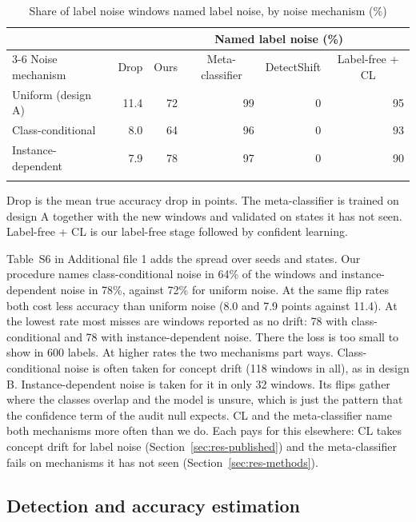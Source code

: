 \documentclass[pdflatex,referee,lineno,sn-basic]{sn-jnl}
\begin{document}
\begin{table}[!htbp]\centering\tablebodyfont
\caption{Share of label noise windows named label noise, by noise mechanism (\%)}\label{tab:noise}%
\begin{tabular}{@{}lrrrrr@{}}
\toprule
 & \multicolumn{1}{c}{} & \multicolumn{4}{c}{Named label noise (\%)} \\
\cmidrule(lr){3-6}
Noise mechanism & \multicolumn{1}{c}{Drop} & \multicolumn{1}{c}{Ours} & \multicolumn{1}{c}{Meta-classifier} & \multicolumn{1}{c}{DetectShift} & \multicolumn{1}{c}{Label-free + CL} \\
\midrule
Uniform (design A) & 11.4 & 72 & 99 & 0 & 95 \\
Class-conditional & 8.0 & 64 & 96 & 0 & 93 \\
Instance-dependent & 7.9 & 78 & 97 & 0 & 90 \\
\botrule
\end{tabular}
\end{table}

Drop is the mean true accuracy drop in points. The meta-classifier is trained on design A together with the new windows and validated on states it has not seen. Label-free + CL is our label-free stage followed by confident learning.

Table~S6 in Additional file 1 adds the spread over seeds and states. Our procedure names class-conditional noise in 64\% of the windows and instance-dependent noise in 78\%, against 72\% for uniform noise. At the same flip rates both cost less accuracy than uniform noise (8.0 and 7.9 points against 11.4). At the lowest rate most misses are windows reported as no drift: 78 with class-conditional and 78 with instance-dependent noise. There the loss is too small to show in 600 labels. At higher rates the two mechanisms part ways. Class-conditional noise is often taken for concept drift (118 windows in all), as in design B. Instance-dependent noise is taken for it in only 32 windows. Its flips gather where the classes overlap and the model is unsure, which is just the pattern that the confidence term of the audit null expects. CL and the meta-classifier name both mechanisms more often than we do. Each pays for this elsewhere: CL takes concept drift for label noise (Section~\ref{sec:res-published}) and the meta-classifier fails on mechanisms it has not seen (Section~\ref{sec:res-methods}).

\subsection{Detection and accuracy estimation}\label{sec:res-detection}
\end{document}
